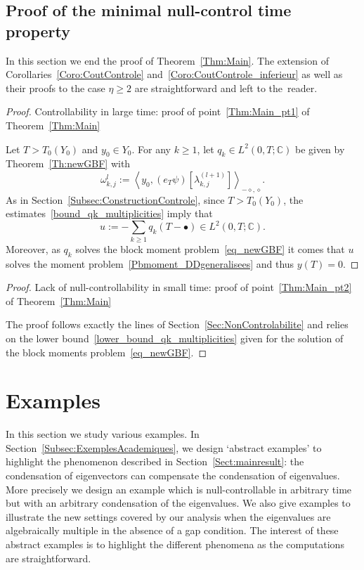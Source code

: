 \documentclass[10pt]{amsart}
\theoremstyle{definition}\newtheorem{defi}[theo]{Definition}\newtheorem{rema}[theo]{Remark}\newtheorem{exam}[theo]{Example}\newtheorem{exem}[theo]{Example}\newtheorem{nota}[theo]{Notation}
\newcommand{\Fzp}{Y_0}
\newcommand{\dual}[2]{\left\langle #1, #2 \right\rangle_{-\diamond,\diamond}}
\newcommand{\C}{\mathbb{C}}
\renewcommand{\cdot}{{\scriptstyle \bullet}}
\begin{document}
\subsection{Proof of the minimal null-control time property} \label{Subsec:NC_DDgeneralisees}


In this section we end the proof of Theorem~\ref{Thm:Main}. The extension of Corollaries~\ref{Coro:CoutControle} and~\ref{Coro:CoutControle_inferieur} as well as their proofs to the case $\eta \geq 2$ are straightforward and left to the~reader.

\begin{proof}{Controllability in large time: proof of point~\eqref{Thm:Main_pt1} of Theorem~\ref{Thm:Main}}


Let $T> T_0(\Fzp)$ and $y_0 \in \Fzp$. For any $k \geq 1$, let $q_k \in L^2(0,T ; \C)$ be given by Theorem~\ref{Th:newGBF} with
\[
\omega_{k,j}^l := \dual{y_0}{(e_T \psi) [\lambda_{k,j}^{(l+1)}] }.
\]
As in Section~\ref{Subsec:ConstructionControle}, since $T >T_0(\Fzp)$, the estimates~\eqref{bound_qk_multiplicities} imply that
\[
u := -\sum_{k \geq 1} q_k (T-\cdot) \in L^2(0,T ; \C).
\]
Moreover, as $q_k$ solves the block moment problem~\eqref{eq_newGBF} it comes that $u$ solves the moment problem~\eqref{Pbmoment_DDgeneralisees} and thus $y(T)=0$.
\end{proof}



\begin{proof}{Lack of null-controllability in small time: proof of point~\eqref{Thm:Main_pt2} of Theorem~\ref{Thm:Main}}

The proof follows exactly the lines of Section~\ref{Sec:NonControlabilite} and relies on the lower bound~\eqref{lower_bound_qk_multiplicities} given for the solution of the block moments problem~\eqref{eq_newGBF}.
\end{proof}



\section{Examples}\label{Sec:Examples}

In this section we study various examples. In Section~\ref{Subsec:ExemplesAcademiques}, we design `abstract examples' to highlight the phenomenon described in Section~\ref{Sect:mainresult}: the condensation of eigenvectors can compensate the condensation of eigenvalues. More precisely we design an example which is null-controllable in arbitrary time but with an arbitrary condensation of the eigenvalues. We also give examples to illustrate the new settings covered by our analysis when the eigenvalues are algebraically multiple in the absence of a gap condition. The interest of these abstract examples is to highlight the different phenomena as the computations are straightforward.
\end{document}
